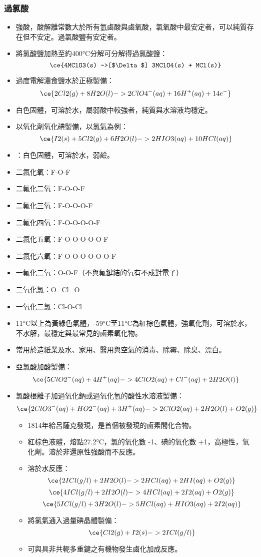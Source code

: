 \documentclass[a4paper,12pt]{report}
\begin{document}
\subsubsection{過氯酸}
\begin{itemize}
\item 強酸，酸解離常數大於所有氫鹵酸與鹵氧酸，氯氧酸中最安定者，可以純質存在但不安定。過氯酸鹽有安定者。
\item 將氯酸鹽加熱至約400°C分解可分解得過氯酸鹽：
\[\ce{4MClO3(s) ->[$\Delta$] 3MClO4(s) + MCl(s)}\]
\item 過度電解濃食鹽水於正極製備：
\[\ce{2Cl2(g) + 8H2O(l) -> 2ClO4^-(aq) + 16H^+(aq) + 14e^-}\]
\eit
{}
\bit
\item 白色固體，可溶於水，屬弱酸中較強者，純質與水溶液均穩定。
\item 以氧化劑氧化碘製備，以氯氣為例：
\[\ce{I2(s) + 5Cl2(g) + 6H2O(l) -> 2HIO3(aq) + 10HCl(aq)}\]
\item {}：白色固體，可溶於水，弱鹼。
\eit
{}
\bit
\item 二氟化氧：F-O-F
\item 二氟化二氧：F-O-O-F
\item 二氟化三氧：F-O-O-O-F
\item 二氟化四氧：F-O-O-O-O-F
\item 二氟化五氧：F-O-O-O-O-O-F
\item 二氟化六氧：F-O-O-O-O-O-O-F
\item 一氟化二氧：O-O-F（不與氟鍵結的氧有不成對電子）
\item 二氧化氯：O=Cl=O
\item 一氧化二氯：Cl-O-Cl
\eit
{}
\bit
\item 11°C以上為黃綠色氣體，-59°C至11°C為紅棕色氣體，強氧化劑，可溶於水，不水解，最穩定與最常見的鹵素氧化物。
\item 常用於造紙業及水、家用、醫用與空氣的消毒、除霉、除臭、漂白。
\item 亞氯酸加酸製備：
\[\ce{5ClO2^-(aq) + 4H^+(aq) -> 4ClO2(aq) + Cl^-(aq) + 2H2O(l)}\]
\item 氯酸根離子加過氧化鈉或過氧化氫的酸性水溶液製備：
\[\ce{2ClO3^-(aq) + HO2^-(aq) + 3H^+(aq) -> 2ClO2(aq) + 2H2O(l) + O2(g)}\]
\eit
{}
\begin{itemize}
\item 1814年給呂薩克發現，是首個被發現的鹵素間化合物。
\item 紅棕色液體，熔點27.2°C，氯的氧化數 -1、碘的氧化數 +1，高極性，氧化劑。溶於非還原性強酸而不反應。
\item 溶於水反應：
\[\ce{2ICl(g/l) + 2H2O(l) -> 2HCl(aq) + 2HI(aq) + O2(g)}\]
\[\ce{4ICl(g/l) + 2H2O(l) -> 4HCl(aq) + 2I2(aq) + O2(g)}\]
\[\ce{5ICl(g/l) + 3H2O(l) -> 5HCl(aq) + HIO3(aq) + 2I2(aq)}\]
\item 將氯氣通入過量碘晶體製備：
\[\ce{Cl2(g) + I2(s) -> 2ICl(g/l)}\]
\item 可與具非共軛多重鍵之有機物發生鹵化加成反應。
\end{itemize}

\end{itemize}
\end{document}

